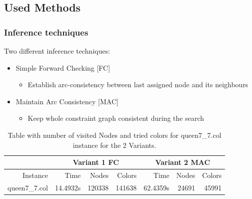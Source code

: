 \documentclass{beamer}
\begin{document}
\subsection{Used Methods}
\begin{frame}
    \frametitle{Inference techniques}
	Two different inference techniques:
	\begin{itemize}
	\item{Simple Forward Checking [FC]}	
		\begin{itemize}	
		\item{Establish arc-consistency between last assigned node and its neighbours}
		\end{itemize}
	\item{Maintain Arc Consistency [MAC]}
	\begin{itemize}	
		\item{Keep whole constraint graph consistent during the search}
		\end{itemize}
	\end{itemize}

\begin{table}
  \tiny
 \begin{center}
          \begin{tabular}{r | r | r | r | r | r | r}
            \hline
             & \multicolumn{3}{c|}{Variant 1 FC} & \multicolumn{3}{c}{Variant 2 MAC} \\
            \hline
            Instance & Time & Nodes & Colors &  Time & Nodes & Colors \\
            \hline \hline 
            queen7\_7.col & 14.4932s & 120338 & 141638 & 62.4359s & 24691 & 45991\\
            \hline
\end{tabular}
        \caption{Table with number of visited Nodes and tried colors for queen7\_7.col instance for the 2 Variants. }
        \label{visitedTable}
        \end{center}
\end{table}

  \end{frame}
\end{document}
